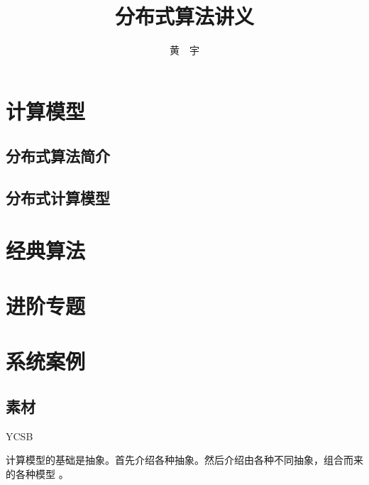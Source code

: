 \documentclass[UTF8]{ctexrep}
\newcommand{\mybreak}{\vspace{1cm}}
\begin{document}
\title{\Huge \bf 分布式算法讲义}

\author{黄\ \ 宇}

\maketitle

\tableofcontents

\part{计算模型}

\chapter{分布式算法简介}


\chapter{分布式计算模型}


\part{经典算法}


\part{进阶专题}


\part{系统案例}


\chapter*{素材}


YCSB \cite{Cooper10, YCSB-github}


\mybreak

计算模型的基础是抽象。首先介绍各种抽象。然后介绍由各种不同抽象，组合而来的各种模型 \cite{Cachin11}。
\end{document}
